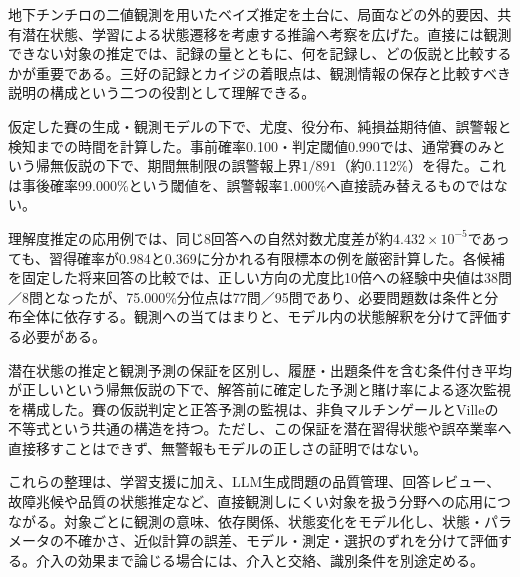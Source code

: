 \documentclass[11pt,a4paper]{article}
\numberwithin{equation}{section}
\begin{document}
地下チンチロの二値観測を用いたベイズ推定を土台に、局面などの外的要因、共有潜在状態、学習による状態遷移を考慮する推論へ考察を広げた。直接には観測できない対象の推定では、記録の量とともに、何を記録し、どの仮説と比較するかが重要である。三好の記録とカイジの着眼点は、観測情報の保存と比較すべき説明の構成という二つの役割として理解できる。

仮定した賽の生成・観測モデルの下で、尤度、役分布、純損益期待値、誤警報と検知までの時間を計算した。事前確率0.100・判定閾値0.990では、通常賽のみという帰無仮説の下で、期間無制限の誤警報上界$1/891$（約0.112\%）を得た。これは事後確率99.000\%という閾値を、誤警報率1.000\%へ直接読み替えるものではない。

理解度推定の応用例では、同じ8回答への自然対数尤度差が約$4.432\times10^{-5}$であっても、習得確率が0.984と0.369に分かれる有限標本の例を厳密計算した。各候補を固定した将来回答の比較では、正しい方向の尤度比10倍への経験中央値は38問／8問となったが、75.000\%分位点は77問／95問であり、必要問題数は条件と分布全体に依存する。観測への当てはまりと、モデル内の状態解釈を分けて評価する必要がある。

潜在状態の推定と観測予測の保証を区別し、履歴・出題条件を含む条件付き平均が正しいという帰無仮説の下で、解答前に確定した予測と賭け率による逐次監視を構成した。賽の仮説判定と正答予測の監視は、非負マルチンゲールとVilleの不等式という共通の構造を持つ。ただし、この保証を潜在習得状態や誤卒業率へ直接移すことはできず、無警報もモデルの正しさの証明ではない。

これらの整理は、学習支援に加え、LLM生成問題の品質管理、回答レビュー、故障兆候や品質の状態推定など、直接観測しにくい対象を扱う分野への応用につながる。対象ごとに観測の意味、依存関係、状態変化をモデル化し、状態・パラメータの不確かさ、近似計算の誤差、モデル・測定・選択のずれを分けて評価する。介入の効果まで論じる場合には、介入と交絡、識別条件を別途定める。
\end{document}
